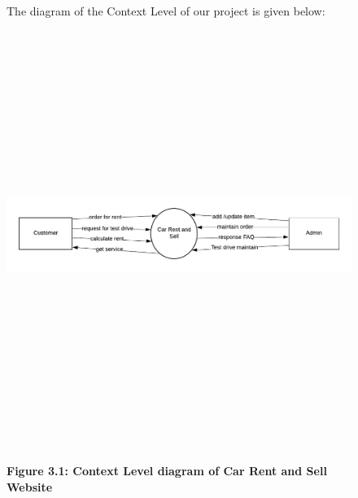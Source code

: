 \begin{figure}
\noindent The diagram of the Context Level of our project is given below:\\



\includegraphics[width=6.00in, height=5.50in]{figures/C0}

\noindent 

\noindent 
{\bf Figure 3.1: Context Level diagram of Car Rent and Sell Website}
\end{figure}

\noindent 

